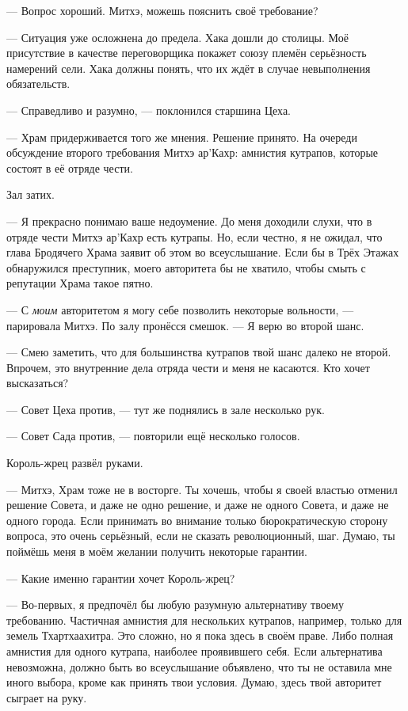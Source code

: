 --- Вопрос хороший.
Митхэ, можешь пояснить своё требование?

--- Ситуация уже осложнена до предела.
Хака дошли до столицы.
Моё присутствие в качестве переговорщика покажет союзу племён серьёзность намерений сели.
Хака должны понять, что их ждёт в случае невыполнения обязательств.

--- Справедливо и разумно, --- поклонился старшина Цеха.

--- Храм придерживается того же мнения.
Решение принято.
На очереди обсуждение второго требования Митхэ ар'Кахр: амнистия кутрапов, которые состоят в её отряде чести.

Зал затих.

--- Я прекрасно понимаю ваше недоумение.
До меня доходили слухи, что в отряде чести Митхэ ар'Кахр есть кутрапы.
Но, если честно, я не ожидал, что глава Бродячего Храма заявит об этом во всеуслышание.
Если бы в Трёх Этажах обнаружился преступник, моего авторитета бы не хватило, чтобы смыть с репутации Храма такое пятно.

--- С \emph{моим} авторитетом я могу себе позволить некоторые вольности, --- парировала Митхэ.
По залу пронёсся смешок.
--- Я верю во второй шанс.

--- Смею заметить, что для большинства кутрапов твой шанс далеко не второй.
Впрочем, это внутренние дела отряда чести и меня не касаются.
Кто хочет высказаться?

--- Совет Цеха против, --- тут же поднялись в зале несколько рук.

--- Совет Сада против, --- повторили ещё несколько голосов.

Король-жрец развёл руками.

--- Митхэ, Храм тоже не в восторге.
Ты хочешь, чтобы я своей властью отменил решение Совета, и даже не одно решение, и даже не одного Совета, и даже не одного города.
Если принимать во внимание только бюрократическую сторону вопроса, это очень серьёзный, если не сказать революционный, шаг.
Думаю, ты поймёшь меня в моём желании получить некоторые гарантии.

--- Какие именно гарантии хочет Король-жрец?

--- Во-первых, я предпочёл бы любую разумную альтернативу твоему требованию.
Частичная амнистия для нескольких кутрапов, например, только для земель Тхартхаахитра.
Это сложно, но я пока здесь в своём праве.
Либо полная амнистия для одного кутрапа, наиболее проявившего себя.
Если альтернатива невозможна, должно быть во всеуслышание объявлено, что ты не оставила мне иного выбора, кроме как принять твои условия.
Думаю, здесь твой авторитет сыграет на руку.

